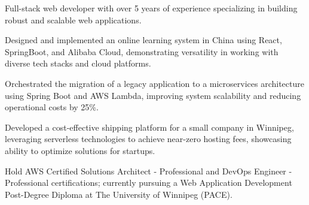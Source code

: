 

\vspace{3mm}
\begin{cvparagraph}

    \begin{cvitems} %
        \item {Full-stack web developer with over 5 years of experience specializing in building robust and scalable web applications.}
        \item {Designed and implemented an online learning system in China using React, SpringBoot, and Alibaba Cloud, demonstrating versatility in working with diverse tech stacks and cloud platforms.}
        \item {Orchestrated the migration of a legacy application to a microservices architecture using Spring Boot and AWS Lambda, improving system scalability and reducing operational costs by 25\%.}
        \item {Developed a cost-effective shipping platform for a small company in Winnipeg, leveraging serverless technologies to achieve near-zero hosting fees, showcasing ability to optimize solutions for startups.}
        \item {Hold AWS Certified Solutions Architect - Professional and DevOps Engineer - Professional certifications; currently pursuing a Web Application Development Post-Degree Diploma at The University of Winnipeg (PACE).}
    \end{cvitems}

\end{cvparagraph}


